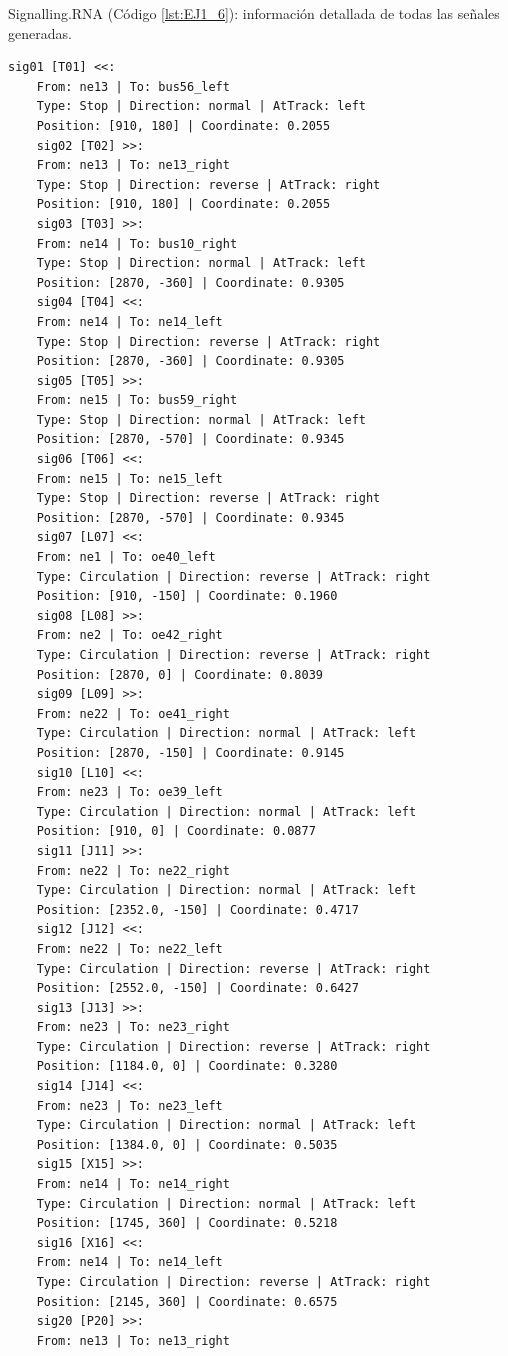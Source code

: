 	Signalling.RNA (Código \ref{lst:EJ1_6}): información detallada de todas las señales generadas.
	
	\begin{lstlisting}[language = {}, caption = Signalling.RNA, label = {lst:EJ1_6}]
	sig01 [T01] <<:
	From: ne13 | To: bus56_left
	Type: Stop | Direction: normal | AtTrack: left 
	Position: [910, 180] | Coordinate: 0.2055
	sig02 [T02] >>:
	From: ne13 | To: ne13_right
	Type: Stop | Direction: reverse | AtTrack: right 
	Position: [910, 180] | Coordinate: 0.2055
	sig03 [T03] >>:
	From: ne14 | To: bus10_right
	Type: Stop | Direction: normal | AtTrack: left 
	Position: [2870, -360] | Coordinate: 0.9305
	sig04 [T04] <<:
	From: ne14 | To: ne14_left
	Type: Stop | Direction: reverse | AtTrack: right 
	Position: [2870, -360] | Coordinate: 0.9305
	sig05 [T05] >>:
	From: ne15 | To: bus59_right
	Type: Stop | Direction: normal | AtTrack: left 
	Position: [2870, -570] | Coordinate: 0.9345
	sig06 [T06] <<:
	From: ne15 | To: ne15_left
	Type: Stop | Direction: reverse | AtTrack: right 
	Position: [2870, -570] | Coordinate: 0.9345
	sig07 [L07] <<:
	From: ne1 | To: oe40_left
	Type: Circulation | Direction: reverse | AtTrack: right 
	Position: [910, -150] | Coordinate: 0.1960
	sig08 [L08] >>:
	From: ne2 | To: oe42_right
	Type: Circulation | Direction: reverse | AtTrack: right 
	Position: [2870, 0] | Coordinate: 0.8039
	sig09 [L09] >>:
	From: ne22 | To: oe41_right
	Type: Circulation | Direction: normal | AtTrack: left 
	Position: [2870, -150] | Coordinate: 0.9145
	sig10 [L10] <<:
	From: ne23 | To: oe39_left
	Type: Circulation | Direction: normal | AtTrack: left 
	Position: [910, 0] | Coordinate: 0.0877
	sig11 [J11] >>:
	From: ne22 | To: ne22_right
	Type: Circulation | Direction: normal | AtTrack: left 
	Position: [2352.0, -150] | Coordinate: 0.4717
	sig12 [J12] <<:
	From: ne22 | To: ne22_left
	Type: Circulation | Direction: reverse | AtTrack: right 
	Position: [2552.0, -150] | Coordinate: 0.6427
	sig13 [J13] >>:
	From: ne23 | To: ne23_right
	Type: Circulation | Direction: reverse | AtTrack: right 
	Position: [1184.0, 0] | Coordinate: 0.3280
	sig14 [J14] <<:
	From: ne23 | To: ne23_left
	Type: Circulation | Direction: normal | AtTrack: left 
	Position: [1384.0, 0] | Coordinate: 0.5035
	sig15 [X15] >>:
	From: ne14 | To: ne14_right
	Type: Circulation | Direction: normal | AtTrack: left 
	Position: [1745, 360] | Coordinate: 0.5218
	sig16 [X16] <<:
	From: ne14 | To: ne14_left
	Type: Circulation | Direction: reverse | AtTrack: right 
	Position: [2145, 360] | Coordinate: 0.6575
	sig20 [P20] >>:
	From: ne13 | To: ne13_right

\end{lstlisting}
